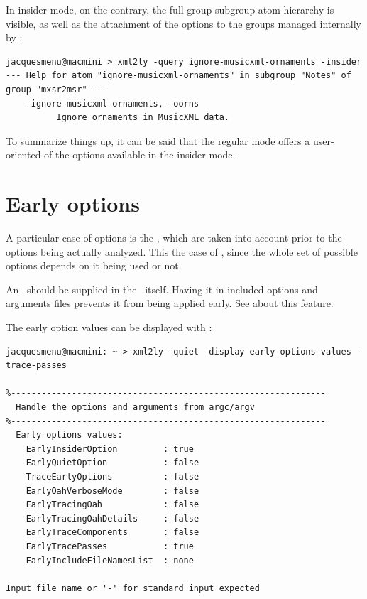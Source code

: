 In insider mode, on the contrary, the full group-subgroup-atom hierarchy is visible, as well as the attachment of the options to the groups managed internally by \mf:
\begin{lstlisting}[language=Terminal]
jacquesmenu@macmini > xml2ly -query ignore-musicxml-ornaments -insider
--- Help for atom "ignore-musicxml-ornaments" in subgroup "Notes" of group "mxsr2msr" ---
    -ignore-musicxml-ornaments, -oorns
          Ignore ornaments in MusicXML data.
\end{lstlisting}

To summarize things up, it can be said that the regular mode offers a user-oriented  of the options available in the insider mode.


\section{Early options}

A particular case of options is the , which are taken into account prior to the options being actually analyzed.
This the case of , since the whole set of possible options depends on it being used or not.

An \earlyOption\ should be supplied in the \CLI\ itself. Having it in included options and arguments files prevents it from being applied early. See  about this feature.

The early option values can be displayed with :
\begin{lstlisting}[language=Terminal]
jacquesmenu@macmini: ~ > xml2ly -quiet -display-early-options-values -trace-passes

%--------------------------------------------------------------
  Handle the options and arguments from argc/argv
%--------------------------------------------------------------
  Early options values:
    EarlyInsiderOption         : true
    EarlyQuietOption           : false
    TraceEarlyOptions          : false
    EarlyOahVerboseMode        : false
    EarlyTracingOah            : false
    EarlyTracingOahDetails     : false
    EarlyTraceComponents       : false
    EarlyTracePasses           : true
    EarlyIncludeFileNamesList  : none

Input file name or '-' for standard input expected
\end{lstlisting}


